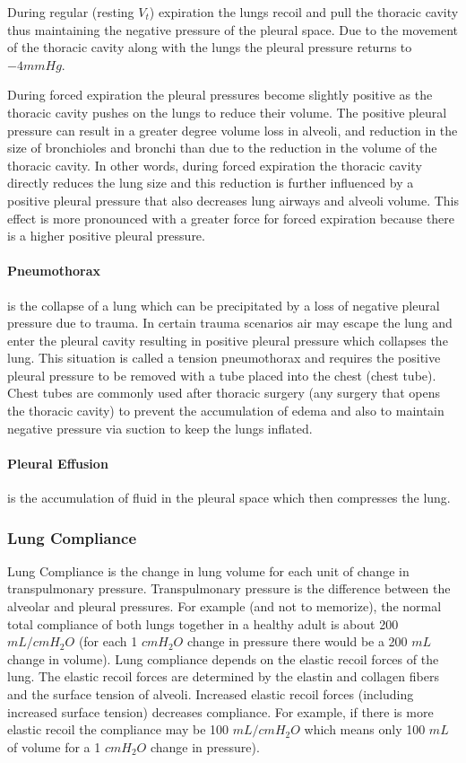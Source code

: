 During regular (resting $V_t$) expiration the lungs recoil and pull the thoracic cavity thus maintaining the negative pressure of the pleural space. Due to the movement of the thoracic cavity along with the lungs the pleural pressure returns to $-4 mmHg$.

During forced expiration the pleural pressures become slightly positive as the thoracic cavity pushes on the lungs to reduce their volume. The positive pleural pressure can result in a greater degree volume loss in alveoli, and reduction in the size of bronchioles and bronchi than due to the reduction in the volume of the thoracic cavity. In other words, during forced expiration the thoracic cavity directly reduces the lung size and this reduction is further influenced by a positive pleural pressure that also decreases lung airways and alveoli volume. This effect is more pronounced with a greater force for forced expiration because there is a higher positive pleural pressure.

\paragraph{Pneumothorax} is the collapse of a lung which can be precipitated by a loss of negative pleural pressure due to trauma. In certain trauma scenarios air may escape the lung and enter the pleural cavity resulting in positive pleural pressure which collapses the lung. This situation is called a tension pneumothorax and requires the positive pleural pressure to be removed with a tube placed into the chest (chest tube). Chest tubes are commonly used after thoracic surgery (any surgery that opens the thoracic cavity) to prevent the accumulation of edema and also to maintain negative pressure via suction to keep the lungs inflated.

\paragraph{Pleural Effusion} is the accumulation of fluid in the pleural space which then compresses the lung.

\subsubsection{Lung Compliance} 

Lung Compliance is the change in lung volume for each unit of change in transpulmonary pressure. Transpulmonary pressure is the difference between the alveolar and pleural pressures. For example (and not to memorize), the normal total compliance of both lungs together in a healthy adult is about 200 $mL/cm H_2O$ (for each 1  $cm H_2O$ change in pressure there would be a 200 $mL$ change in volume). 
Lung compliance depends on the elastic recoil forces of the lung. The elastic recoil forces are determined by the elastin and collagen fibers and the surface tension of alveoli. Increased elastic recoil forces (including increased surface tension) decreases compliance. For example, if there is more elastic recoil the compliance may be 100 $mL/cm H_2O$ which means only 100 $mL$ of volume for a 1 $cm H_2O$ change in pressure).

